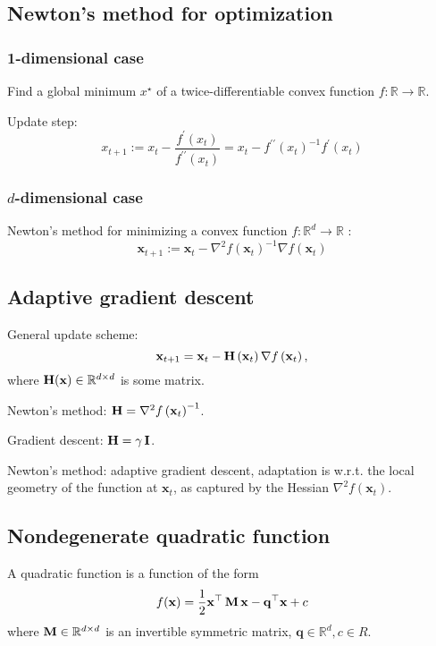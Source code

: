 \subsection*{Newton's method for optimization}
\subsubsection*{1-dimensional case}
Find a global minimum $x^{\star}$ of a twice-differentiable convex function $f: \mathbb{R} \rightarrow \mathbb{R}$.

Update step:
$$
x_{t+1}:=x_{t}-\frac{f^{\prime}\left(x_{t}\right)}{f^{\prime \prime}\left(x_{t}\right)}=x_{t}-f^{\prime \prime}\left(x_{t}\right)^{-1} f^{\prime}\left(x_{t}\right)
$$


\subsubsection*{$d$-dimensional case}
Newton's method for minimizing a convex function $f: \mathbb{R}^{d} \rightarrow \mathbb{R}$ :
$$
\mathbf{x}_{t+1}:=\mathbf{x}_{t}-\nabla^{2} f\left(\mathbf{x}_{t}\right)^{-1} \nabla f\left(\mathbf{x}_{t}\right)
$$




\subsection*{Adaptive gradient descent}
General update scheme:
$$
\mathbf{x}_{t+1}=\mathbf{x}_{t}-\operatorname{\boldsymbol{\mathbf{H}}}\left(\mathbf{x}_{t}\right) \nabla f\left(\mathbf{x}_{t}\right),
$$
where $\operatorname{\boldsymbol{\mathbf{H}}}(\mathbf{x}) \in \mathbb{R}^{d \times d}$ is some matrix.

Newton's method: $\operatorname{\boldsymbol{\mathbf{H}}}=\nabla^{2} f\left(\mathbf{x}_{t}\right)^{-1}$.

Gradient descent: $\operatorname{\boldsymbol{\mathbf{H}}}=\gamma \operatorname{\boldsymbol{\mathbf{I}}}$.

Newton's method: adaptive gradient descent, adaptation is w.r.t. the local geometry of the function at $\mathbf{x}_{t}$, as captured by the Hessian $\nabla^{2} f\left(\mathbf{x}_{t}\right)$.







\subsection*{Nondegenerate quadratic function}
A  quadratic function is a function of the form
$$
f(\mathbf{x})=\frac{1}{2} \mathbf{x}^{\top} \operatorname{\boldsymbol{\mathbf{M}}} \mathbf{x}-\mathbf{q}^{\top} \mathbf{x}+c
$$
where $\operatorname{\boldsymbol{\mathbf{M}}} \in \mathbb{R}^{d \times d}$ is an invertible symmetric matrix, $\mathbf{q} \in \mathbb{R}^{d}, c \in R$. 

